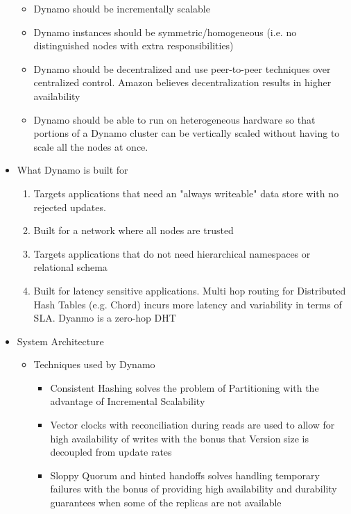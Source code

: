\documentclass[a4paper]{article}
\begin{document}
\begin{itemize}
\begin{itemize}
\item Dynamo should be incrementally scalable

\item Dynamo instances should be symmetric/homogeneous (i.e. no distinguished nodes with extra responsibilities)

\item Dynamo should be decentralized and use peer-to-peer techniques over centralized control. Amazon believes decentralization results in higher availability

\item Dynamo should be able to run on heterogeneous hardware so that portions of a Dynamo cluster can be vertically scaled without having to scale all the nodes at once.
\end{itemize}

\item What Dynamo is built for
\begin{enumerate}
\item Targets applications that need an "always writeable" data store with no rejected updates.

\item Built for a network where all nodes are trusted

\item Targets applications that do not need hierarchical namespaces or relational schema

\item Built for latency sensitive applications. Multi hop routing for Distributed Hash Tables (e.g. Chord) incurs more latency and variability in terms of SLA. Dyanmo is a zero-hop DHT 
\end{enumerate}

\item System Architecture
\begin{itemize}
\item Techniques used by Dynamo
\begin{itemize}
\item Consistent Hashing solves the problem of Partitioning with the advantage of Incremental Scalability

\item Vector clocks with reconciliation during reads are used to allow for high availability of writes with the bonus that Version size is decoupled from update rates

\item Sloppy Quorum and hinted handoffs solves handling temporary failures with the bonus of providing high availability and durability guarantees when some of the replicas are not available


\end{itemize}
\end{itemize}
\end{itemize}
\end{document}
